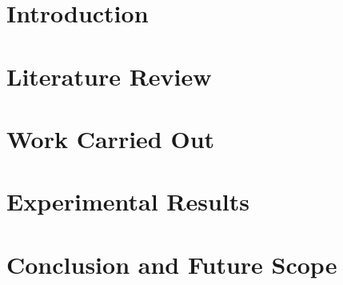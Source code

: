 \documentclass[12pt]{report}
\begin{document}

\begin{screen}
\ppttitle
\end{screen}
\footskip 0.7cm
\thispagestyle{empty} 
\pagetitle
\newpage
{}
\cfoot{\thepage}

\newpage

\newpage



\newpage
\tableofcontents
\newpage
\listoffigures
\newpage

\cfoot{\thepage}

\newpage
\chapter{Introduction}

\newpage
%
\chapter{Literature Review}

\chapter{Work Carried Out}

%

\chapter{Experimental Results}

\chapter{Conclusion and Future Scope}


\end{document}
